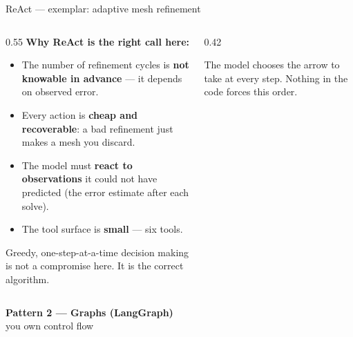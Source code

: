 \documentclass[aspectratio=169,10pt]{beamer}
\newcommand{\hl}[1]{\textcolor{accent}{\textbf{#1}}}
\begin{document}
\begin{frame}{ReAct --- exemplar: adaptive mesh refinement}
\begin{columns}[T,onlytextwidth]
\begin{column}{0.55\textwidth}
\textbf{Why ReAct is the right call here:}
\begin{itemize}\itemsep5pt\small
  \item The number of refinement cycles is \hl{not knowable in advance} ---
        it depends on observed error.
  \item Every action is \hl{cheap and recoverable}: a bad refinement just makes
        a mesh you discard.
  \item The model must \hl{react to observations} it could not have predicted
        (the error estimate after each solve).
  \item The tool surface is \hl{small} --- six tools.
\end{itemize}
\vspace{0.5em}
Greedy, one-step-at-a-time decision making is not a compromise here.
It is the correct algorithm.
\end{column}
\begin{column}{0.42\textwidth}
\begin{center}
\end{center}
\vspace{0.3em}
{\scriptsize\color{gray} The model chooses the arrow to take at every step.
Nothing in the code forces this order.}
\end{column}
\end{columns}
\end{frame}

\begin{frame}[plain]
\begin{center}
{\Large\bfseries Pattern 2 --- Graphs (LangGraph)}\\[0.5em]
{\large\color{gray} you own control flow}
\end{center}
\end{frame}
\end{document}
